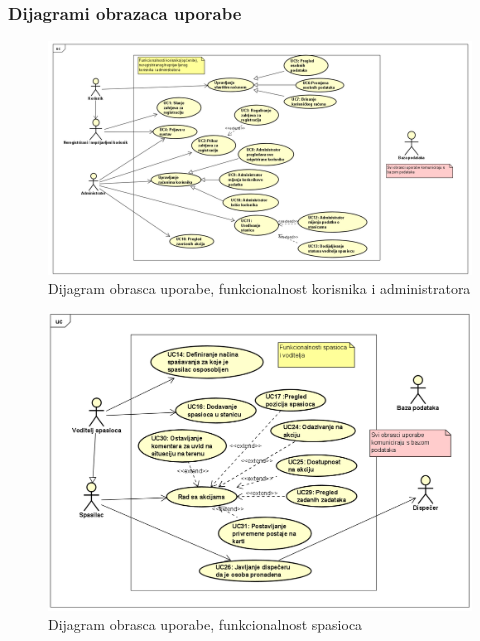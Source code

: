 				\eject
					
				\subsubsection{Dijagrami obrazaca uporabe}	
				
				\begin{figure}[h!]
					\centering
					\includegraphics[width=\textwidth]{./slike/Korisnik,Administrator.png}
					\caption{Dijagram obrasca uporabe, funkcionalnost korisnika i administratora}
				
				\end{figure}
				
				\begin{figure}[h!]
					\centering
					\includegraphics[width=\textwidth]{./slike/Spasioci.png}
					\caption{Dijagram obrasca uporabe, funkcionalnost spasioca}
					
				\end{figure}
				
